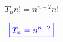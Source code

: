 \begin{frame}{}
  \[
    T_n n! = n^{n-2}n!
  \]

  \pause
  \[
    \textcolor{blue}{\boxed{T_{n} = n^{n-2}}}
  \]

  \pause
\end{frame}



